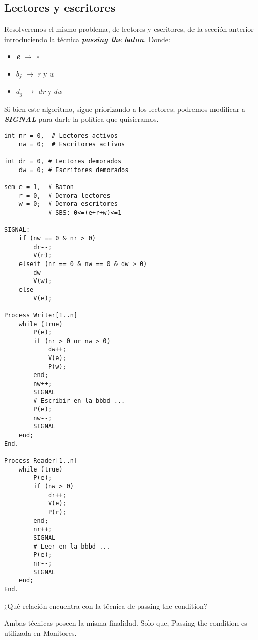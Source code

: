\documentclass[a4paper, 10pt]{report}
\begin{document}
\subsection{Lectores y escritores}

Resolveremos el mismo problema, de lectores y escritores, de la sección anterior introduciendo la técnica \textbf{\emph{passing the baton}}. Donde:

\begin{itemize}
    \item \textbf{\emph{e}} $\rightarrow$ \emph{e}
    \item \textbf{\emph{$b_j$}} $\rightarrow$ \emph{r} y \emph{w}
    \item \textbf{\emph{$d_j$}} $\rightarrow$ \emph{dr} y \emph{dw}
\end{itemize}

Si bien este algoritmo, sigue priorizando a los lectores; podremos modificar a \textbf{\emph{SIGNAL}} para darle la política que quisieramos.

\begin{lstlisting}[multicols=2]
int nr = 0,  # Lectores activos
    nw = 0;  # Escritores activos

int dr = 0, # Lectores demorados
    dw = 0; # Escritores demorados

sem e = 1,  # Baton
    r = 0,  # Demora lectores
    w = 0;  # Demora escritores
            # SBS: 0<=(e+r+w)<=1

SIGNAL:
    if (nw == 0 & nr > 0)
        dr--;
        V(r);
    elseif (nr == 0 & nw == 0 & dw > 0)
        dw--
        V(w);
    else
        V(e);

Process Writer[1..n]
    while (true)
        P(e);
        if (nr > 0 or nw > 0)
            dw++;
            V(e);
            P(w);
        end;
        nw++;
        SIGNAL
        # Escribir en la bbbd ...
        P(e);
        nw--;
        SIGNAL
    end;
End.

Process Reader[1..n]
    while (true)
        P(e);
        if (nw > 0)
            dr++;
            V(e);
            P(r);
        end;
        nr++;
        SIGNAL
        # Leer en la bbbd ...
        P(e);
        nr--;
        SIGNAL
    end;
End.
\end{lstlisting}

\begin{basic_box}
     ¿Qué relación encuentra con la técnica de passing the condition?

    Ambas técnicas poseen la misma finalidad. Solo que, Passing the condition es utilizada en Monitores.
\end{basic_box}
\end{document}
